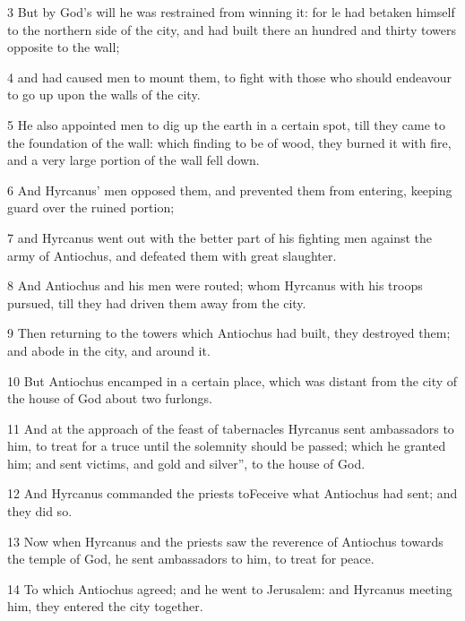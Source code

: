 \par 3 But by God’s will he was restrained from winning it: for le had betaken himself to the northern side of the city, and had built there an hundred and thirty towers opposite to the wall; 

\par 4 and had caused men to mount them, to fight with those who should endeavour to go up upon the walls of the city. 

\par 5 He also appointed men to dig up the earth in a certain spot, till they came to the foundation of the wall: which finding to be of wood, they burned it with fire, and a very large portion of the wall fell down. 

\par 6 And Hyrcanus’ men opposed them, and prevented them from entering, keeping guard over the ruined portion; 

\par 7 and Hyrcanus went out with the better part of his fighting men against the army of Antiochus, and defeated them with great slaughter. 

\par 8 And Antiochus and his men were routed; whom Hyrcanus with his troops pursued, till they had driven them away from the city. 

\par 9 Then returning to the towers which Antiochus had built, they destroyed them; and abode in the city, and around it. 

\par 10 But Antiochus encamped in a certain place, which was distant from the city of the house of God about two furlongs. 

\par 11 And at the approach of the feast of tabernacles Hyrcanus sent ambassadors to him, to treat for a truce until the solemnity should be passed; which he granted him; and sent victims, and gold and silver”, to the house of God. 

\par 12 And Hyrcanus commanded the priests toFeceive what Antiochus had sent; and they did so. 

\par 13 Now when Hyrcanus and the priests saw the reverence of Antiochus towards the temple of God, he sent ambassadors to him, to treat for peace. 

\par 14 To which Antiochus agreed; and he went to Jerusalem: and Hyrcanus meeting him, they entered the city together. 


